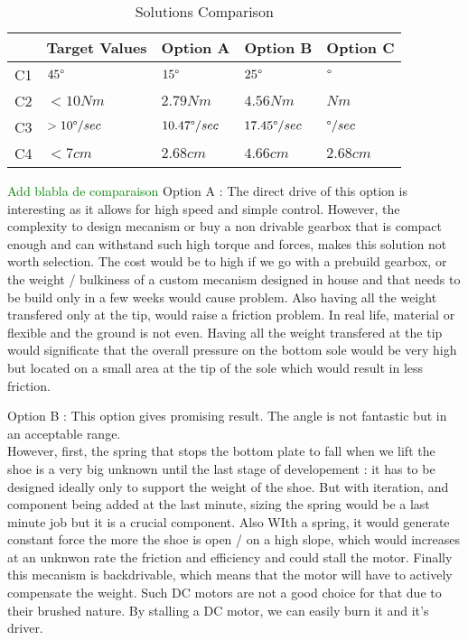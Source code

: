 \documentclass[lettersize,journal]{IEEEtran}
\begin{document}
\begin{table}[!ht]
\begin{centering}
\begin{tabularx}{1\linewidth}{|A|M|M|M|M|}
 \hline
   & Target Values & Option A & Option B & Option C  \\ [0.5ex] 
 \hline\hline
  C1 &  $45\degree$ & $15\degree$ & $25\degree$ & $\degree$\\
 \hline
  C2 &  $< 10Nm$  & $2.79 Nm$ & $4.56 Nm$ & $ Nm$ \\
 \hline
   C3 &  $> 10\degree/sec$  & $10.47\degree/sec$ & $17.45\degree/sec$ & $\degree/sec$ \\
 \hline
   C4 &  $< 7cm$  & $2.68cm$ & $4.66cm$ & $2.68cm$ \\
\hline
\end{tabularx}
\caption{Solutions Comparison}
\label{comparisonTable}
\end{centering}
\end{table}

\textcolor{green}{ Add blabla de comparaison}
Option A : The direct drive of this option is interesting as it allows for high speed and simple control. However, the complexity to design mecanism or buy a non drivable gearbox that is compact enough and can withstand such high torque and forces, makes this solution not worth selection. The cost would be to high if we go with a prebuild gearbox, or the weight / bulkiness of a custom mecanism designed in house and that needs to be build only in a few weeks would cause problem.  Also having all the weight transfered only at the tip, would raise a friction problem. In real life, material or flexible and the ground is not even. Having all the weight transfered at the tip would significate that the overall pressure on the bottom sole would be very high but located on a small area at the tip of the sole which would result in less friction. 

Option B : This option gives promising result. The angle is not fantastic but in an acceptable range. \\
However, first, the spring that stops the bottom plate to fall when we lift the shoe is a very big unknown until the last stage of developement : it has to be designed ideally only to support the weight of the shoe. But with iteration, and component being added at the last minute, sizing the spring would be a last minute job but it is a crucial component. Also WIth a spring, it would generate constant force the more the shoe is open / on a high slope, which would increases at an unknwon rate the friction and efficiency and could stall the motor. 
 Finally this mecanism is backdrivable, which means that the motor will have to actively compensate the weight. Such DC motors are not a good choice for that due to their brushed nature. By stalling a DC motor, we can easily burn it and it's driver.
\end{document}
